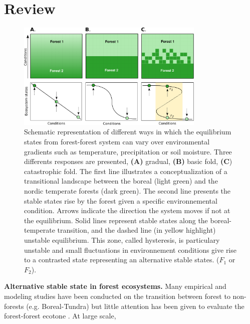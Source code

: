 
\section{Review} 

\begin{figure}[t]
	\begin{center}
	\includegraphics[width=0.8\textwidth]{fig/states.pdf}
	\end{center}
	\caption{Schematic representation of different ways in which the equilibrium
	states from forest-forest system can vary over environmental gradients such as temperature, precipitation
	or soil moisture. Three differents responses are presented,
	\textbf{(A)} gradual, \textbf{(B)} basic fold, \textbf{(C}) catastrophic fold.
	The first line illustrates a conceptualization of a transitional landscape
	between the boreal (light green) and the nordic temperate forests (dark
	green). The second line presents the stable states rise by the forest
	given a specific environnemental condition. Arrows indicate the
	direction the system moves if not at the equilibrium. Solid lines represent stable states along the boreal-temperate
	transition, and the dashed line (in yellow highlight) unstable equilibrium. This zone,
	called hysteresis, is particulary unstable and small fluctuations in
	environnement conditions give rise to a contrasted state representing an
	alternative stable states. ($F_1$ or $F_2$).}
	\label{fig1}
\end{figure}


\textbf{Alternative stable state in forest ecosystems.}  Many empirical  and
modeling studies have been conducted on the transition between forest to non-
forests (e.g. Boreal-Tundra)
\cite{Scheffer2012,Scheffer2001,Hirota2011,Messaoud2007} but little attention
has been given to evaluate the forest-forest ecotone
\cite{Goldblum2010,Graignic2013}. At large scale,


